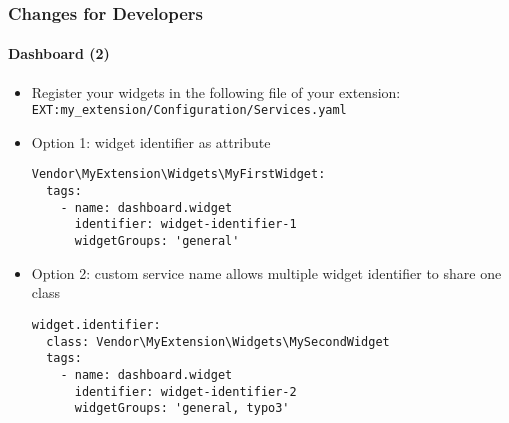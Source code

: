 
\begin{frame}[fragile]
	\frametitle{Changes for Developers}
	\framesubtitle{Dashboard (2)}

	\lstset{basicstyle=\tiny\ttfamily}

	\begin{itemize}
		\item Register your widgets in the following file of your extension:\newline
			\texttt{EXT:my\_extension/Configuration/Services.yaml}

		\item Option 1: widget identifier as attribute

\vspace{-0.4cm}
\begin{lstlisting}
Vendor\MyExtension\Widgets\MyFirstWidget:
  tags:
    - name: dashboard.widget
      identifier: widget-identifier-1
      widgetGroups: 'general'
\end{lstlisting}

		\item Option 2: custom service name allows multiple widget identifier to share one class

\vspace{-0.4cm}
\begin{lstlisting}
widget.identifier:
  class: Vendor\MyExtension\Widgets\MySecondWidget
  tags:
    - name: dashboard.widget
      identifier: widget-identifier-2
      widgetGroups: 'general, typo3'
\end{lstlisting}

	\end{itemize}

\end{frame}


